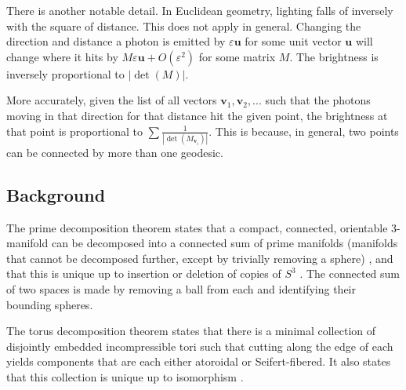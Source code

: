 There is another notable detail. In Euclidean geometry, lighting falls of inversely with the square of distance. This does not apply in general. Changing the direction and distance a photon is emitted by $\varepsilon\textbf{u}$ for some unit vector $\textbf{u}$ will change where it hits by $M\varepsilon\textbf{u} + O(\varepsilon^2)$ for some matrix $M$. The brightness is inversely proportional to $|\det(M)|$.

More accurately, given the list of all vectors $\textbf{v}_1, \textbf{v}_2, ...$ such that the photons moving in that direction for that distance hit the given point, the brightness at that point is proportional to $\sum\frac{1}{|\det(M_{\textbf{v}_i})|}$. This is because, in general, two points can be connected by more than one geodesic.


\subsection{Background}

The prime decomposition theorem states that a compact, connected, orientable 3-manifold can be decomposed into a connected sum of prime manifolds (manifolds that cannot be decomposed further, except by trivially removing a sphere) \cite{Kneser}, and that this is unique up to insertion or deletion of copies of $S^3$ \cite{Milnor}. The connected sum of two spaces is made by removing a ball from each and identifying their bounding spheres.
  

The torus decomposition theorem states that there is a minimal collection of disjointly embedded incompressible tori such that cutting along the edge of each yields components that are each either atoroidal or Seifert-fibered. It also states that this collection is unique up to isomorphism \cite{JSJ3} \cite{JSJ2} \cite{JSJ1} \cite{JSJ4}.

